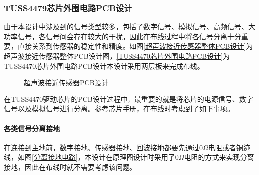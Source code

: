 	\subsubsection{TUSS4479芯片外围电路PCB设计}
    由于本设计中涉及到的信号类型较多，包括了数字信号、模拟信号、高频信号、大功率信号，各信号间会存在较大的干扰，因此在布线过程中将各信号分离十分重要，直接关系到传感器的稳定性和精度。如图\ref{超声波接近传感器整体PCB设计}为超声波接近传感器整体PCB设计图，\ref{TUSS4470芯片外围电路PCB设计}为TUSS4470芯片外围电路PCB设计本设计采用两层板来完成布线。
      \begin{figure}[ht]
      	\centering
      	\caption{超声波接近传感器PCB设计}
      	\label{超声波接近传感器PCB设计}
      \end{figure}
  
    在TUSS4470驱动芯片的PCB设计过程中，最重要的就是将芯片的电源信号、数字信号以及模拟信号进行分离。参考芯片手册，在布线时考虑到了如下事项。\par
    \paragraph{各类信号分离接地}
    在连接到主地前，数字接地、传感器接地、回波接地都要先通过0$\Omega$电阻或者铜迹线，如图\ref{分离接地电路}，本设计在原理图设计时采用了0$\Omega$电阻的方式来实现分离接地，因此在布线时就不需要考虑该问题。
